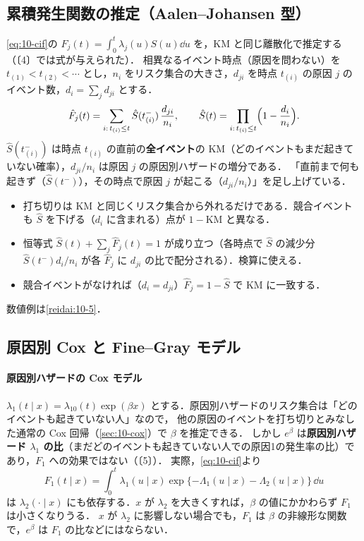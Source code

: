 \subsection{累積発生関数の推定（Aalen--Johansen 型）}\label{subsec:10-compete-aj}
\Hinshutsu
\cref{eq:10-cif}の $F_j(t)=\int_0^t\lambda_j(u)S(u)\dd u$ を，KM と同じ離散化で推定する（〔4〕では式が与えられた）．
相異なるイベント時点（原因を問わない）を $t_{(1)}<t_{(2)}<\cdots$ とし，$n_i$ をリスク集合の大きさ，$d_{ji}$ を時点 $t_{(i)}$ の原因 $j$ のイベント数，$d_i=\sum_jd_{ji}$ とする．
\begin{equation}
\hat F_j(t)=\sum_{i:\,t_{(i)}\le t}\hat S(t_{(i)}^-)\,\frac{d_{ji}}{n_i},\qquad \hat S(t)=\prod_{i:\,t_{(i)}\le t}\Bigl(1-\frac{d_i}{n_i}\Bigr).\label{eq:10-aj}
\end{equation}
$\hat S(t_{(i)}^-)$ は時点 $t_{(i)}$ の直前の\textbf{全イベント}の KM（どのイベントもまだ起きていない確率），$d_{ji}/n_i$ は原因 $j$ の原因別ハザードの増分である．
「直前まで何も起きず（$\hat S(t^-)$），その時点で原因 $j$ が起こる（$d_{ji}/n_i$）」を足し上げている．
\begin{itemize}
\item 打ち切りは KM と同じくリスク集合から外れるだけである．競合イベントも $\hat S$ を下げる（$d_i$ に含まれる）点が $1-\mathrm{KM}$ と異なる．
\item 恒等式 $\hat S(t)+\sum_j\hat F_j(t)=1$ が成り立つ（各時点で $\hat S$ の減少分 $\hat S(t^-)d_i/n_i$ が各 $\hat F_j$ に $d_{ji}$ の比で配分される）．検算に使える．
\item 競合イベントがなければ（$d_i=d_{ji}$）$\hat F_j=1-\hat S$ で KM に一致する．
\end{itemize}
数値例は\cref{reidai:10-5}．

\subsection{原因別 Cox と Fine--Gray モデル}\label{subsec:10-compete-reg}
\Hinshutsu
\paragraph{原因別ハザードの Cox モデル}
$\lambda_1(t\mid x)=\lambda_{10}(t)\exp(\beta x)$ とする．原因別ハザードのリスク集合は「どのイベントも起きていない人」なので，
他の原因のイベントを打ち切りとみなした通常の Cox 回帰（\cref{sec:10-cox}）で $\beta$ を推定できる．
しかし $e^\beta$ は\textbf{原因別ハザード $\lambda_1$ の比}（まだどのイベントも起きていない人での原因1の発生率の比）であり，$F_1$ への効果ではない（〔5〕）．
実際，\cref{eq:10-cif}より
\[
F_1(t\mid x)=\int_0^t\lambda_1(u\mid x)\exp\{-\Lambda_1(u\mid x)-\Lambda_2(u\mid x)\}\,\dd u
\]
は $\lambda_2(\cdot\mid x)$ にも依存する．$x$ が $\lambda_2$ を大きくすれば，$\beta$ の値にかかわらず $F_1$ は小さくなりうる．
$x$ が $\lambda_2$ に影響しない場合でも，$F_1$ は $\beta$ の非線形な関数で，$e^\beta$ は $F_1$ の比などにはならない．

